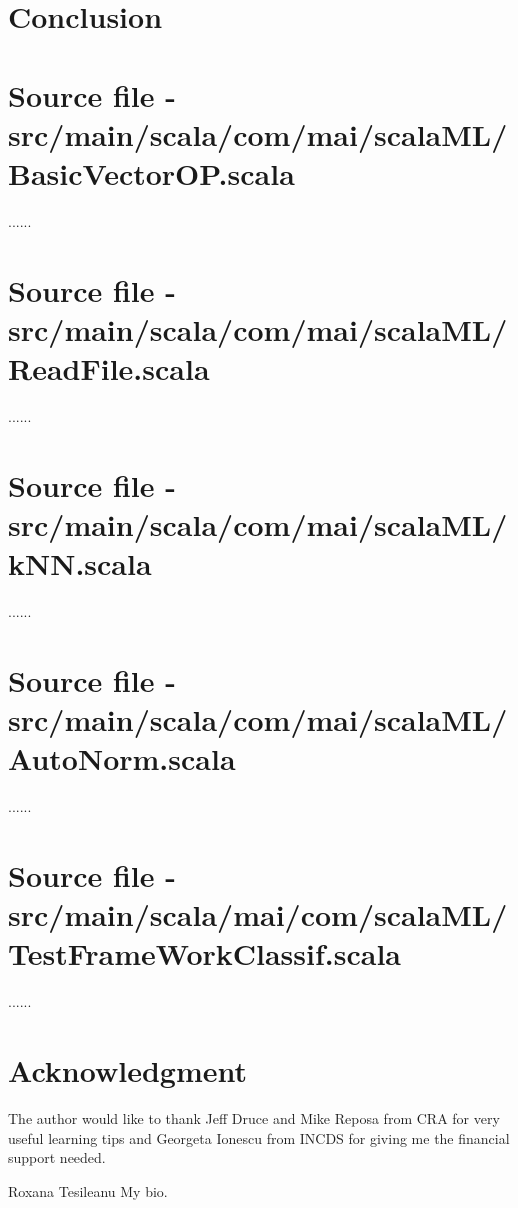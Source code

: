 \documentclass[journal]{IEEEtran}
\begin{document}
\section{Conclusion}
\appendices
\section{Source file - src/main/scala/com/mai/scalaML/BasicVectorOP.scala}

......

\section{Source file - src/main/scala/com/mai/scalaML/ReadFile.scala}

......

\section{Source file - src/main/scala/com/mai/scalaML/kNN.scala}

......

\section{Source file - src/main/scala/com/mai/scalaML/AutoNorm.scala}

......

\section{Source file - src/main/scala/mai/com/scalaML/TestFrameWorkClassif.scala}

......

 

\section*{Acknowledgment}
The author would like to thank Jeff Druce and Mike Reposa from CRA for very useful learning tips and Georgeta Ionescu from INCDS for giving me the financial support needed.


\begin {IEEEbiographynophoto}{Roxana Tesileanu}
My bio.
\end{IEEEbiographynophoto}
\end{document}
